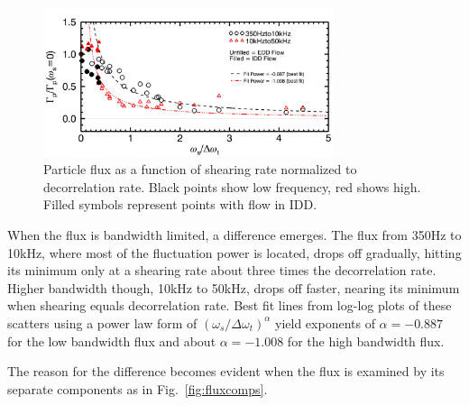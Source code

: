 \documentclass[%
 aps,
 prl,
 amsmath,amssymb,
 reprint,%
]{revtex4-1}
\begin{document}
\begin{figure}
\begin{center}
\includegraphics[width=8.5cm]{fluxvsshear.pdf}%
\caption{\label{fig:fluxvsshear} Particle flux as a function of shearing rate normalized to decorrelation rate. Black points show low frequency, red shows high. Filled symbols represent points with flow in IDD.}
\end{center}
\end{figure}

When the flux is bandwidth limited, a difference emerges. The flux from 350Hz to 10kHz, where most of the fluctuation power is located, drops off gradually, hitting its minimum only at a shearing rate about three times the decorrelation rate. Higher bandwidth though, 10kHz to 50kHz, drops off faster, nearing its minimum when shearing equals decorrelation rate. Best fit lines from log-log plots of these scatters using a power law form of $\left(\omega_{s}/\Delta \omega_{t}\right)^{\alpha}$ yield exponents of $\alpha = -0.887$ for the low bandwidth flux and about $\alpha = -1.008$ for the high bandwidth flux. 

The reason for the difference becomes evident when the flux is examined by its separate components as in Fig.~\ref{fig:fluxcomps}.
\end{document}
